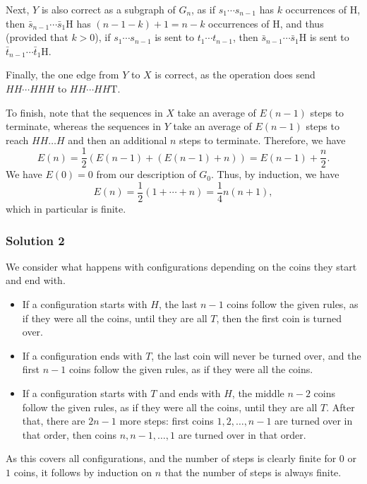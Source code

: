 Next, $Y$ is also correct as a subgraph of $G_n$, as if $s_1\cdots s_{n-1}$ has $k$ occurrences of H, then $\bar{s}_{n-1}\cdots\bar{s}_1\text{H}$ has $(n - 1 - k) + 1 = n - k$ occurrences of H, and thus (provided that $k > 0$), if $s_1\cdots s_{n-1}$ is sent to $t_1\cdots t_{n-1}$, then $\bar{s}_{n-1}\cdots\bar{s}_1\text{H}$ is sent to $\bar{t}_{n-1}\cdots\bar{t}_1\text{H}$.

Finally, the one edge from $Y$ to $X$ is correct, as the operation does send $HH\cdots HHH$ to $HH\cdots HH\text{T}$.

To finish, note that the sequences in $X$ take an average of $E(n - 1)$ steps to terminate, whereas the sequences in $Y$ take an average of $E(n - 1)$ steps to reach $HH \ldots H$ and then an additional $n$ steps to terminate. Therefore, we have
\[
E(n) = \frac{1}{2} \left( E(n - 1) + (E(n - 1) + n) \right) = E(n - 1) + \frac{n}{2}.
\]
We have $E(0) = 0$ from our description of $G_0$. Thus, by induction, we have
\[
E(n) = \frac{1}{2}(1 + \cdots + n) = \frac{1}{4}n(n + 1),
\]
which in particular is finite.

\subsubsection*{Solution 2}
We consider what happens with configurations depending on the coins they start and end with.

\begin{itemize}
  \item If a configuration starts with $H$, the last $n - 1$ coins follow the given rules, as if they were all the coins, until they are all $T$, then the first coin is turned over.
  \item If a configuration ends with $T$, the last coin will never be turned over, and the first $n - 1$ coins follow the given rules, as if they were all the coins.
  \item If a configuration starts with $T$ and ends with $H$, the middle $n - 2$ coins follow the given rules, as if they were all the coins, until they are all $T$. After that, there are $2n - 1$ more steps: first coins $1, 2, \ldots, n - 1$ are turned over in that order, then coins $n, n - 1, \ldots, 1$ are turned over in that order.
\end{itemize}

As this covers all configurations, and the number of steps is clearly finite for $0$ or $1$ coins, it follows by induction on $n$ that the number of steps is always finite.

